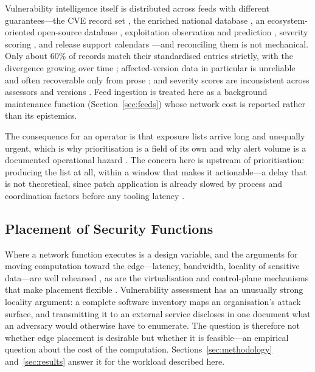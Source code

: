 \documentclass[fleqn,10pt,lineno]{wlpeerj}
\begin{document}
Vulnerability intelligence itself is distributed across feeds with different guarantees---the CVE record set \cite{cvelist}, the enriched national database \cite{nvd}, an ecosystem-oriented open-source database \cite{osv}, exploitation observation and prediction \cite{kev,epss,jacobs2021}, severity scoring \cite{cvss}, and release support calendars \cite{endoflife}---and reconciling them is not mechanical. Only about 60\% of records match their standardised entries strictly, with the divergence growing over time \cite{dong2019}; affected-version data in particular is unreliable \cite{nguyen2013} and often recoverable only from prose \cite{glanz2015}; and severity scores are inconsistent across assessors and versions \cite{wunder2024,walkowski2026}. Feed ingestion is treated here as a background maintenance function (Section~\ref{sec:feeds}) whose network cost is reported rather than its epistemics.

The consequence for an operator is that exposure lists arrive long and unequally urgent, which is why prioritisation is a field of its own \cite{jiang2025survey} and why alert volume is a documented operational hazard \cite{tariq2025,jalalvand2025}. The concern here is upstream of prioritisation: producing the list at all, within a window that makes it actionable---a delay that is not theoretical, since patch application is already slowed by process and coordination factors before any tooling latency \cite{dissanayake2022}.

\subsection{Placement of Security Functions}
Where a network function executes is a design variable, and the arguments for moving computation toward the edge---latency, bandwidth, locality of sensitive data---are well rehearsed \cite{shi2016,mao2017,satya2017,bonomi2012}, as are the virtualisation and control-plane mechanisms that make placement flexible \cite{mijumbi2016,kreutz2015}. Vulnerability assessment has an unusually strong locality argument: a complete software inventory maps an organisation's attack surface, and transmitting it to an external service discloses in one document what an adversary would otherwise have to enumerate. The question is therefore not whether edge placement is desirable but whether it is feasible---an empirical question about the cost of the computation. Sections~\ref{sec:methodology} and~\ref{sec:results} answer it for the workload described here.
\end{document}
